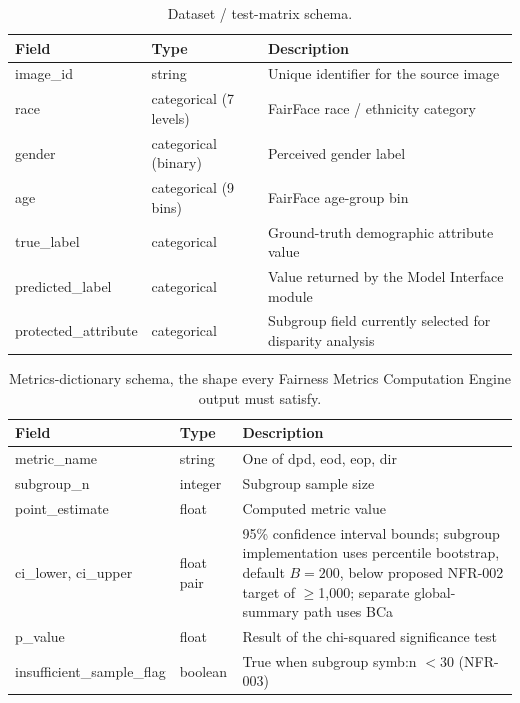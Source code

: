 \begin{table}[htbp]
    \centering
    \renewcommand{\arraystretch}{1.3}
    \caption{Dataset / test-matrix schema.}%
    \label{tab:schema-testmatrix}
    \begin{tabular}{p{3.8cm}p{2.6cm}p{6.9cm}}
        \toprule
        \textbf{Field} & \textbf{Type} & \textbf{Description} \\
        \midrule
        {\ttfamily\footnotesize image\_id} & string & Unique identifier for the source image \\
        {\ttfamily\footnotesize race} & categorical (7 levels) & FairFace race / ethnicity category \\
        {\ttfamily\footnotesize gender} & categorical (binary) & Perceived gender label \\
        {\ttfamily\footnotesize age} & categorical (9 bins) & FairFace age-group bin \\
        {\ttfamily\footnotesize true\_label} & categorical & Ground-truth demographic attribute value \\
        {\ttfamily\footnotesize predicted\_label} & categorical & Value returned by the Model Interface module \\
        {\ttfamily\scriptsize protected\_attribute} & categorical & Subgroup field currently selected for disparity analysis \\
        \bottomrule
    \end{tabular}
\end{table}

\begin{table}[htbp]
    \centering
    \renewcommand{\arraystretch}{1.3}
    \caption{Metrics-dictionary schema, the shape every Fairness Metrics Computation Engine output must satisfy.}%
    \label{tab:schema-metrics}
    \begin{tabular}{p{4.3cm}p{2cm}p{6.9cm}}
        \toprule
        \textbf{Field} & \textbf{Type} & \textbf{Description} \\
        \midrule
        {\ttfamily\footnotesize metric\_name} & string & One of \gls{dpd}, \gls{eod}, \gls{eop}, \gls{dir} \\
        {\ttfamily\footnotesize subgroup\_n} & integer & Subgroup sample size \\
        {\ttfamily\footnotesize point\_estimate} & float & Computed metric value \\
        {\ttfamily\footnotesize ci\_lower}, {\ttfamily\footnotesize ci\_upper} & float pair & 95\% confidence interval bounds; subgroup implementation uses percentile bootstrap, default $B=200$, below proposed NFR-002 target of $\geq$1{,}000; separate global-summary path uses BCa \\
        {\ttfamily\footnotesize p\_value} & float & Result of the chi-squared significance test \\
        {\ttfamily\scriptsize insufficient\_sample\_flag} & boolean & True when subgroup \gls{symb:n} $< 30$ (NFR-003) \\
        \bottomrule
    \end{tabular}
\end{table}

